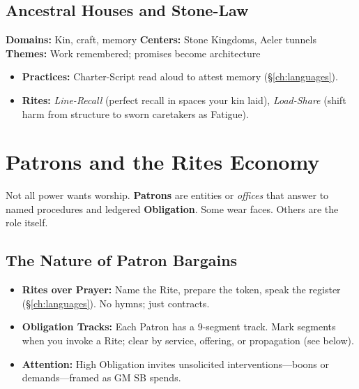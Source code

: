\begin{multicols}{2}
\subsection*{Ancestral Houses and Stone-Law}
\textbf{Domains:} Kin, craft, memory \quad
\textbf{Centers:} Stone Kingdoms, Aeler tunnels \\
\textbf{Themes:} Work remembered; promises become architecture
\begin{itemize}
  \item \textbf{Practices:} Charter-Script read aloud to attest memory (\S\ref{ch:languages}). 
  \item \textbf{Rites:} \emph{Line-Recall} (perfect recall in spaces your kin laid), \emph{Load-Share} (shift harm from structure to sworn caretakers as Fatigue).
\end{itemize}

\section{Patrons and the Rites Economy}
Not all power wants worship. \textbf{Patrons} are entities or \emph{offices} that answer to named procedures and ledgered \textbf{Obligation}. Some wear faces. Others are the role itself.

\subsection*{The Nature of Patron Bargains}
\begin{itemize}
  \item \textbf{Rites over Prayer:} Name the Rite, prepare the token, speak the register (\S\ref{ch:languages}). No hymns; just contracts. 
  \item \textbf{Obligation Tracks:} Each Patron has a 9-segment track. Mark segments when you invoke a Rite; clear by service, offering, or propagation (see below).
  \item \textbf{Attention:} High Obligation invites unsolicited interventions—boons or demands—framed as GM SB spends.
\end{itemize}


\end{multicols}
